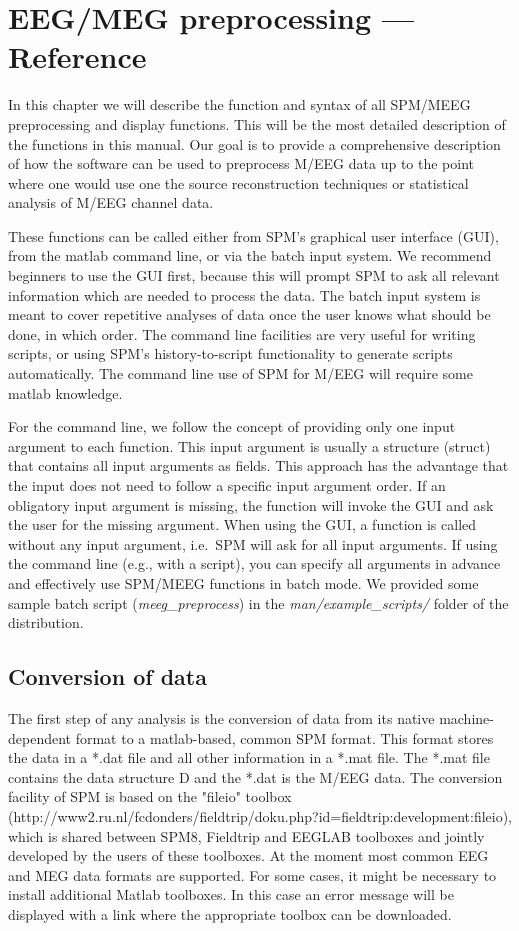 \chapter{EEG/MEG preprocessing --- Reference
  \label{Chap:eeg:preprocessing}} 

In this chapter we will describe the function and syntax of all 
SPM/MEEG preprocessing and display functions. This will be the most
detailed description of the functions  in this
manual. Our goal is to provide a comprehensive description of how the
software can be used to preprocess M/EEG data up to the point where
one would use one the source reconstruction techniques or statistical
analysis of M/EEG channel data.

These functions can be called either from SPM's graphical user
interface (GUI), from the matlab command line, or via the batch input
system. We recommend beginners to use the GUI first, because this will
prompt SPM to ask all relevant information which are needed to process
the data. The batch input system is meant to cover repetitive analyses
of data once the user knows what should be done, in which order. The
command line facilities are very useful for writing scripts, or using
SPM's history-to-script functionality to generate scripts
automatically. The command line use of SPM for M/EEG will require some
matlab knowledge.

For the command line, we follow the concept of providing only one
input argument to each function. This input argument is usually a 
structure (struct) that contains all input arguments as fields. This
approach has the advantage that the input does not need to follow a
specific input argument order. If an obligatory input argument is
missing, the function will invoke the GUI and ask the user for the
missing argument. When using the GUI, a function is called without any
input argument, i.e.~SPM will ask for all input arguments. If using
the command line (e.g., with a script), you can specify all arguments
in advance and effectively use SPM/MEEG functions in batch mode. We
provided some sample batch script (\textit{meeg\_preprocess}) in the
\textit{man/example\_scripts/} folder of the distribution.

\section{Conversion of data}
The first step of any analysis is the conversion of data from its
native machine-dependent format to a matlab-based, common SPM
format. This format stores the data in a *.dat file and all other
information in a *.mat file. The *.mat file contains the data
structure D and the *.dat is the M/EEG data. The conversion facility
of SPM is based on the "fileio" toolbox
(http://www2.ru.nl/fcdonders/fieldtrip/doku.php?id=fieldtrip:development:fileio),
which is shared between SPM8, Fieldtrip and EEGLAB toolboxes and
jointly developed by the users of these toolboxes. At the moment most
common EEG and MEG data formats are supported. For some cases, it
might be necessary to install additional Matlab toolboxes. In this
case an error message will be displayed with a link where the
appropriate toolbox can be downloaded.

